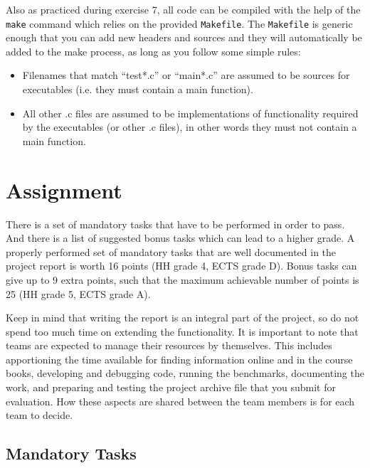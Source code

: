 \documentclass[a4paper,10pt]{article}
\begin{document}
Also as practiced during exercise 7, all code can be compiled with the help of the \texttt{make} command which relies on the provided \texttt{Makefile}.
The \texttt{Makefile} is generic enough that you can add new headers and sources and they will automatically be added to the make process, as long as you follow some simple rules:

\begin{itemize}
\item
  Filenames that match ``test*.c'' or ``main*.c'' are assumed to be sources for executables (i.e. they must contain a main function).
\item
  All other .c files are assumed to be implementations of functionality required by the executables (or other .c files), in other words they must not contain a main function.
\end{itemize}



\section{Assignment}

There is a set of mandatory tasks that have to be performed in order to pass.
And there is a list of suggested bonus tasks which can lead to a higher grade.
A properly performed set of mandatory tasks that are well documented in the project report is worth 16 points (HH grade 4, ECTS grade D).
Bonus tasks can give up to 9 extra points, such that the maximum achievable number of points is 25 (HH grade 5, ECTS grade A).

Keep in mind that writing the report is an integral part of the project, so do not spend too much time on extending the functionality.
It is important to note that teams are expected to manage their resources by themselves.
This includes apportioning the time available for finding information online and in the course books, developing and debugging code, running the benchmarks, documenting the work, and preparing and testing the project archive file that you submit for evaluation.
How these aspects are shared between the team members is for each team to decide.

\subsection{Mandatory Tasks}
\end{document}
